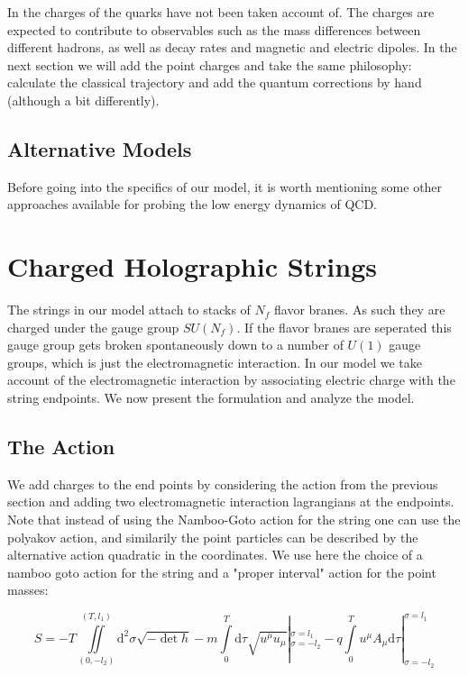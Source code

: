 \documentclass[11pt,a4paper]{article}
\begin{document}
In \cite{Sonnenschein14} the charges of the quarks have not been taken account of. The charges are expected to contribute to observables such as the mass differences between different hadrons, as well as decay rates and magnetic and electric dipoles. In the next section we will add the point charges and take the same philosophy: calculate the classical trajectory and add the quantum corrections by hand (although a bit differently).

\subsection{Alternative Models}

Before going into the specifics of our model, it is worth mentioning some other approaches available for probing the low energy dynamics of QCD. 

\FloatBarrier
\section{Charged Holographic Strings}

The strings in our model attach to stacks of $N_f$ flavor branes. As such they are charged under the gauge group $SU(N_f)$. If the flavor branes are seperated this gauge group gets broken spontaneously down to a number of $U(1)$ gauge groups, which is just the electromagnetic interaction. In our model we take account of the electromagnetic interaction by associating electric charge with the string endpoints. We now present the formulation and analyze the model.

\FloatBarrier
\subsection{The Action}

We add charges to the end points by considering the action from the previous section and adding two electromagnetic interaction lagrangians at the endpoints. Note that instead of using the Namboo-Goto action for the string one can use the polyakov action, and similarily the point particles can be described by the alternative action quadratic in the coordinates. We use here the choice of a namboo goto action for the string and a "proper interval" action for the point masses:

\begin{equation}
S=-T\iint\limits_{(0,-l_{2})}^{(T,l_{1})}\mathrm{d}^{2}\sigma\sqrt{-\det h}-m\int\limits_{0}^{T}\mathrm{d}\tau\sqrt{u^{\mu}u_{\mu}}|_{\sigma=-l_{2}}^{\sigma=l_{1}}-q\int\limits_{0}^{T}u^{\mu}A_{\mu}\mathrm{d}\tau|_{\sigma=-l_{2}}^{\sigma=l_{1}}
\end{equation}
\end{document}
